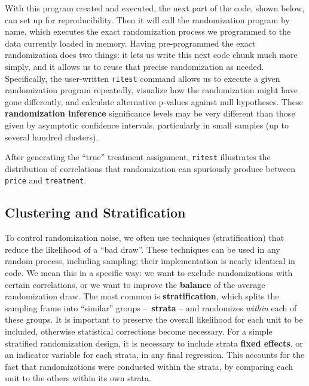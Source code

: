
With this program created and executed,
the next part of the code, shown below,
can set up for reproducibility.
Then it will call the randomization program by name,
which executes the exact randomization process we programmed
to the data currently loaded in memory.
Having pre-programmed the exact randomization does two things:
it lets us write this next code chunk much more simply,
and it allows us to reuse that precise randomization as needed.
Specifically, the user-written \texttt{ritest} command
allows us to execute a given randomization program repeatedly,
visualize how the randomization might have gone differently,
and calculate alternative p-values against null hypotheses.
These \textbf{randomization inference} significance levels may be very different
than those given by asymptotic confidence intervals,
particularly in small samples (up to several hundred clusters).

After generating the ``true'' treatment assignment,
\texttt{ritest} illustrates the distribution of correlations
that randomization can spuriously produce
between \texttt{price} and \texttt{treatment}.


\subsection{Clustering and Stratification}

To control randomization noise, we often use techniques
\index(stratification)
that reduce the likelihood of a ``bad draw''.\cite{athey2017econometrics}
These techniques can be used in any random process,
including sampling; their implementation is nearly identical in code.
We mean this in a specific way: we want to exclude
randomizations with certain correlations,
or we want to improve the \textbf{balance}
of the average randomization draw.\cite{bruhn2009pursuit}
The most common is \textbf{stratification},
which splits the sampling frame into ``similar'' groups – \textbf{strata} –
and randomizes \textit{within} each of these groups.
It is important to preserve the overall likelihood for each unit to be included,
otherwise statistical corrections become necessary.
For a simple stratified randomization design,
it is necessary to include strata \textbf{fixed effects},
or an indicator variable for each strata, in any final regression.
This accounts for the fact that randomizations were conducted within the strata,
by comparing each unit to the others within its own strata.


